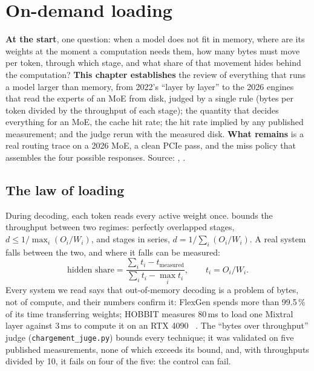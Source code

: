 \chapter{On-demand loading}\label{ch:chargement}

\begin{origine}
\textbf{At the start}, one question: when a model does not fit in memory, where are its weights at the moment a computation needs them, how many bytes must move per token, through which stage, and what share of that movement hides behind the computation?
\textbf{This chapter establishes} the review of everything that runs a model larger than memory, from 2022's \enquote{layer by layer} to the 2026 engines that read the experts of an MoE from disk, judged by a single rule (bytes per token divided by the throughput of each stage); the quantity that decides everything for an MoE, the cache hit rate; the hit rate implied by any published measurement; and the judge rerun with the measured disk.
\textbf{What remains} is a real routing trace on a 2026 MoE, a clean PCIe pass, and the miss policy that assembles the four possible responses.
Source: , .
\end{origine}

\section{The law of loading}\label{sec:loi-chargement}

During decoding, each token reads every active weight once.  bounds the throughput between two regimes: perfectly overlapped stages, $d \le 1/\max_i (O_i/W_i)$, and stages in series, $d = 1/\sum_i (O_i/W_i)$. A real system falls between the two, and where it falls can be measured:
\begin{equation}\label{eq:part-cachee}
\text{hidden share} = \frac{\sum_i t_i - t_{\text{measured}}}{\sum_i t_i - \max_i t_i}, \qquad t_i = O_i/W_i .
\end{equation}
Every system we read says that out-of-memory decoding is a problem of bytes, not of compute, and their numbers confirm it: FlexGen spends more than 99.5\,\% of its time transferring weights; HOBBIT measures 80\,ms to load one Mixtral layer against 3\,ms to compute it on an RTX 4090 \litt~\cite{flexgen2023,hobbit2024}. The \enquote{bytes over throughput} judge (\texttt{chargement\_juge.py}) bounds every technique; it was validated on five published measurements, none of which exceeds its bound, and, with throughputs divided by 10, it fails on four of the five: the control can fail.

